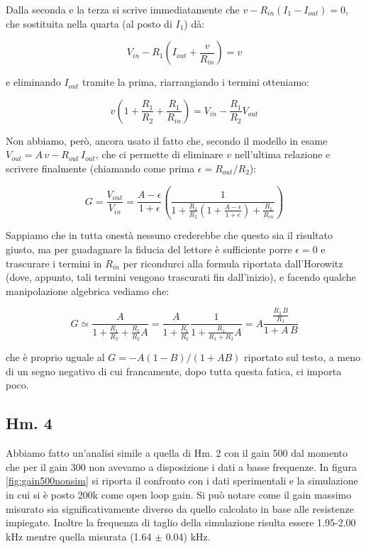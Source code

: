 \documentclass[journal, a4paper]{IEEEtran}
\begin{document}
Dalla seconda e la terza si scrive immediatamente che $v - R_{in} (I_1 - I_{out}) = 0$, che sostituita nella quarta (al posto di $I_1$) dà:

\begin{equation}
V_{in} - R_1 (I_{out} + \frac{v}{R_{in}}) = v
\end{equation}

e eliminando $I_{out}$ tramite la prima, riarrangiando i termini otteniamo:

\begin{equation}
v (1 + \frac{R_1}{R_2} + \frac{R_1}{R_{in}}) = V_{in} - \frac{R_1}{R_2}V_{out}
\end{equation}

Non abbiamo, però, ancora usato il fatto che, secondo il modello in esame $V_{out} = A\, v - R_{out}\, I_{out}$, che ci permette di eliminare $v$ nell'ultima relazione e scrivere finalmente (chiamando come prima $\epsilon = R_{out}/R_2$):

\begin{equation}
G = \frac{V_{out}}{V_{in}} = \frac{A- \epsilon}{1 + \epsilon}(\frac{1}{1 + \frac{R_1}{R_2}(1 + \frac{A-\epsilon}{1 + \epsilon}) + \frac{R_1}{R_{in}}})
\end{equation}

Sappiamo che in tutta onestà nessuno crederebbe che questo sia il risultato giusto, ma per guadagnare la fiducia del lettore è sufficiente porre $\epsilon = 0$ e trascurare i termini in $R_{in}$ per ricondurci alla formula riportata dall'Horowitz (dove, appunto, tali termini vengono trascurati fin dall'inizio), e facendo qualche manipolazione algebrica vediamo che:

\begin{equation}
G \simeq \frac{A}{1 + \frac{R_1}{R_2} + \frac{R_1}{R_2}A} = \frac{A}{1 + \frac{R_1}{R_2}}\frac{1}{1 + \frac{R_1}{R_1 + R_2}A} = A \frac{\frac{R_2 \, B}{R_1}}{1 + A\,B}
\end{equation}

che è proprio uguale al $G = -A(1-B)/(1 + AB)$ riportato sul testo, a meno di un segno negativo di cui francamente, dopo tutta questa fatica, ci importa poco.

\subsection{Hm. 4}

Abbiamo fatto un'analisi simile a quella di Hm. 2 con il gain 500 dal momento che per il gain 300 non avevamo a disposizione i dati a basse frequenze. In figura \ref{fig:gain500nonsim} si riporta il confronto con i dati sperimentali e la simulazione in cui si è posto 200k come open loop gain. Si può notare come il gain massimo misurato sia significativamente diverso da quello calcolato in base alle resistenze impiegate. Inoltre la frequenza di taglio della simulazione risulta essere 1.95-2.00 kHz mentre quella misurata (1.64 $\pm$ 0.04) kHz.
\end{document}
